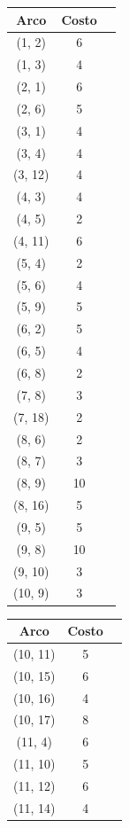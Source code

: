 \documentclass{article}
\begin{document}
  \begin{table}[h!]
    \centering
    \begin{tabular}{ccc}
      \toprule
        Arco & Costo \\
      \midrule
        (1, 2) & 6 \\
        (1, 3) & 4 \\
        (2, 1) & 6 \\
        (2, 6) & 5 \\
        (3, 1) & 4 \\
        (3, 4) & 4 \\
        (3, 12) & 4 \\
        (4, 3) & 4 \\
        (4, 5) & 2 \\
        (4, 11) & 6 \\
        (5, 4) & 2 \\
        (5, 6) & 4 \\
        (5, 9) & 5 \\
        (6, 2) & 5 \\
        (6, 5) & 4 \\
        (6, 8) & 2 \\
        (7, 8) & 3 \\
        (7, 18) & 2 \\
        (8, 6) & 2 \\
        (8, 7) & 3 \\
        (8, 9) & 10 \\
        (8, 16) & 5 \\
        (9, 5) & 5 \\
        (9, 8) & 10 \\
        (9, 10) & 3 \\
        (10, 9) & 3 \\
      \bottomrule
    \end{tabular}
    \begin{tabular}{ccc}
      \toprule
        Arco & Costo \\
      \midrule
        (10, 11) & 5 \\
        (10, 15) & 6 \\
        (10, 16) & 4 \\
        (10, 17) & 8 \\
        (11, 4) & 6 \\
        (11, 10) & 5 \\
        (11, 12) & 6 \\
        (11, 14) & 4 \\

\end{tabular}
\end{table}
\end{document}
